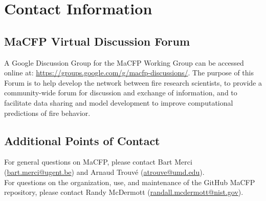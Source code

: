 \documentclass[12pt]{article}
\begin{document}
\section{Contact Information}
 \subsection*{MaCFP Virtual Discussion Forum}
A Google Discussion Group for the MaCFP Working Group can be accessed online at: \url{https://groups.google.com/g/macfp-discussions/}. The purpose of this Forum is to help develop the network between fire research scientists, to provide a community-wide forum for discussion and exchange of information, and to facilitate data sharing and model development to improve computational predictions of fire behavior.\\

 \subsection*{Additional Points of Contact}
\noindent For general questions on MaCFP, please contact Bart Merci (\href{mailto:bart.merci@ugent.be}{bart.merci@ugent.be}) and Arnaud Trouv\'e (\href{mailto:atrouve@umd.edu}{atrouve@umd.edu}).\\

\noindent For questions on the organization, use, and maintenance of the GitHub MaCFP repository, please contact Randy McDermott (\href{mailto:randall.mcdermott@nist.gov}{randall.mcdermott@nist.gov}).\\
\end{document}
